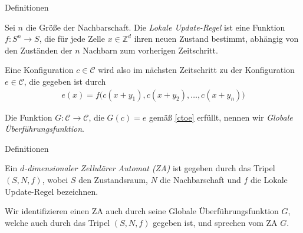 \documentclass[aspectratio=169]{beamer}
\begin{document}
    \begin{frame}{Definitionen}
      \begin{definition*}
        Sei $n$ die Größe der Nachbarschaft. Die \textit{Lokale Update-Regel} ist eine Funktion $f: S^n \to S$, die für jede Zelle $x \in \mathbb{Z}^d$ ihren neuen Zustand bestimmt, abhängig von den Zuständen der $n$ Nachbarn zum vorherigen Zeitschritt.
      \end{definition*}

      \pause

      Eine Konfiguration $c \in \mathcal{C}$ wird also im nächsten Zeitschritt zu der Konfiguration $e \in \mathcal{C}$, die gegeben ist durch
      \begin{align}\label{ctoe}
        e(x) = f \big(c(x+y_1), c(x+y_2), \dots, c(x+y_n)\big)
      \end{align}

      \pause

      \begin{definition*}
        Die Funktion $G: \mathcal{C} \to \mathcal{C}$, die $G(c)=e$ gemäß \eqref{ctoe} erfüllt, nennen wir \textit{Globale Überführungsfunktion}.
      \end{definition*}

    \end{frame}



  \begin{frame}{Definitionen}
    \begin{definition*}
      Ein \textit{$d$-dimensionaler Zellulärer Automat (ZA)} ist gegeben durch das Tripel $(S,N,f)$, wobei $S$ den Zustandsraum, $N$ die Nachbarschaft und $f$ die Lokale Update-Regel bezeichnen.
    \end{definition*}

    \pause

    \begin{remark*}
      Wir identifizieren einen ZA auch durch seine Globale Überführungsfunktion $G$, welche auch durch das Tripel $(S,N,f)$ gegeben ist, und sprechen vom ZA $G$.
    \end{remark*}

  \end{frame}
\end{document}

